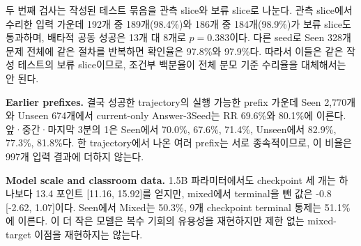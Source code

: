\documentclass[10pt,conference]{IEEEtran}
\begin{document}
두 번째 검사는 작성된 테스트 묶음을 관측 slice와 보류 slice로 나눈다. 관측 slice에서 수리한 입력 가운데 192개 중 189개(98.4\%)와 186개 중 184개(98.9\%)가 보류 slice도 통과하며, 배타적 공동 성공은 13개 대 8개로 \(p=0.383\)이다. 다른 seed로 Seen 328개 문제 전체에 같은 절차를 반복하면 확인율은 97.8\%와 97.9\%다. 따라서 이들은 같은 작성 테스트의 보류 slice이므로, 조건부 백분율이 전체 분모 기준 수리율을 대체해서는 안 된다.

\noindent\textbf{Earlier prefixes.} 결국 성공한 trajectory의 실행 가능한 prefix 가운데 Seen 2,770개와 Unseen 674개에서 current-only Answer-3Seed는 RR 69.6\%와 80.1\%에 이른다. 앞·중간·마지막 3분의 1은 Seen에서 70.0\%, 67.6\%, 71.4\%, Unseen에서 82.9\%, 77.3\%, 81.8\%다. 한 trajectory에서 나온 여러 prefix는 서로 종속적이므로, 이 비율은 997개 입력 결과에 더하지 않는다.

\noindent\textbf{Model scale and classroom data.} 1.5B 파라미터에서도 checkpoint 세 개는 하나보다 13.4 포인트 [11.16, 15.92]를 얻지만, mixed에서 terminal을 뺀 값은 -0.8 [-2.62, 1.07]이다. Seen에서 Mixed는 50.3\%, 9개 checkpoint terminal 통제는 51.1\%에 이른다. 이 더 작은 모델은 복수 기회의 유용성을 재현하지만 제한 없는 mixed-target 이점을 재현하지는 않는다.
\end{document}
